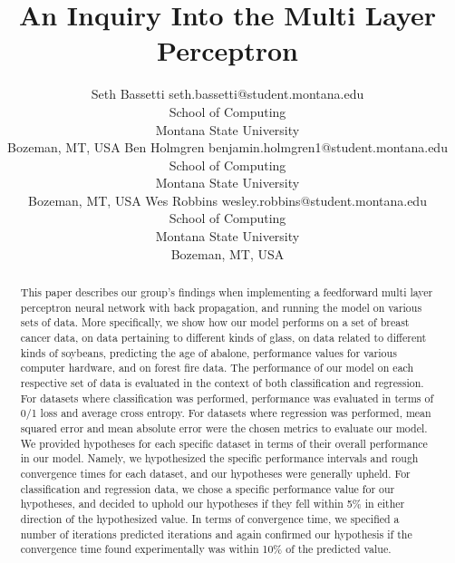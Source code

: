 \documentclass[twoside,11pt]{article}
\begin{document}
\title{An Inquiry Into the Multi Layer Perceptron}

\author{\name Seth Bassetti \email seth.bassetti@student.montana.edu \\
       \addr School of Computing\\
       Montana State University\\
       Bozeman, MT, USA
	\AND
	\name Ben Holmgren \email benjamin.holmgren1@student.montana.edu \\
       \addr School of Computing\\
       Montana State University\\
       Bozeman, MT, USA
       \AND
       \name Wes Robbins \email wesley.robbins@student.montana.edu \\
       \addr School of Computing\\
       Montana State University\\
       Bozeman, MT, USA}

\maketitle

\begin{abstract}%
This paper describes our group's findings when implementing a feedforward multi layer
perceptron neural network with back propagation, and running the model on various sets of data. 
 More specifically, we show how our model performs on a set of breast cancer data, on data pertaining
to different kinds of glass, on data related to different kinds of soybeans, predicting the age of abalone,
performance values for various computer hardware, and on forest fire data.
	The performance of our model on each respective set of data
 is evaluated in the context of both classification and regression. For datasets where
 classification was performed, performance was evaluated in terms of
 0/1 loss and average cross entropy. For datasets where regression was performed,
 mean squared error and mean absolute error were the chosen metrics to evaluate
 our model. We provided hypotheses for each specific dataset in terms of their overall performance in our model.
 Namely, we hypothesized the specific performance intervals and rough convergence times for each dataset, and our
 hypotheses were generally upheld. For classification and regression data, we chose a specific performance value for
our hypotheses, and decided to uphold our hypotheses if they fell within 5\% in either direction of the hypothesized
value. In terms of convergence time, we specified a number of iterations predicted iterations and again confirmed our hypothesis
if the convergence time found experimentally was within 10\% of the predicted value.
\end{abstract}
\end{document}
